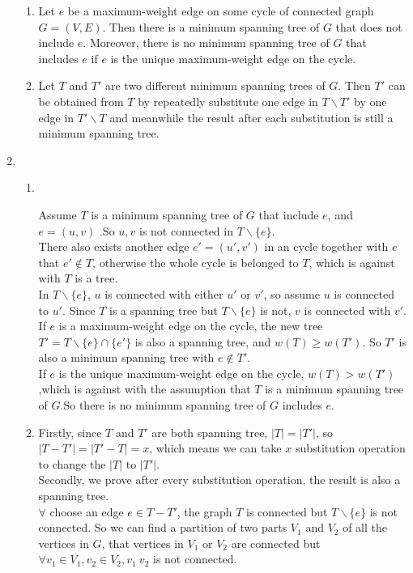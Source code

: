 \documentclass[12pt,a4paper]{article}
\makeatletter
\newtheorem*{solution}{Solution}
\theoremstyle{definition}
\renewenvironment{solution}[1][Solution] {\par\pushQED{\qed}\normalfont\topsep6\p@\@plus6\p@\relax\trivlist\item[\hskip\labelsep\bfseries#1\@addpunct{.}]\ignorespaces}{\popQED\endtrivlist\@endpefalse} \makeatother
\makeatother
\begin{document}
\begin{enumerate}
	\begin{enumerate}
		\item Let $e$ be a maximum-weight edge on some cycle of connected graph $G=(V,E)$.
        Then there is a minimum spanning tree of $G$ that does not include $e$. Moreover, there is no minimum spanning tree of $G$ that includes $e$ if $e$ is the unique maximum-weight edge on the cycle. 
		\item Let $T$ and $T'$ are two different minimum spanning trees of $G$. Then $T'$ can be obtained from $T$ by repeatedly substitute one edge in $T\backslash T'$ by one edge in $T'\backslash T$ and meanwhile the result after each substitution is still a minimum spanning tree.
	\end{enumerate}
	\begin{solution}
	~\par
	\begin{enumerate}
	    \item 
	    ~\par
	    Assume $T$ is a minimum spanning tree of $G$ that include $e$, and $e=(u,v)$ .So $u,v$ is not connected in $T\backslash\{e\}$. \\There also exists another edge $e'=(u',v')$ in an cycle together with $e$ that $e'\notin T$, otherwise the whole cycle is belonged to $T$, which is against with $T$ is a tree. \\In $T\backslash\{e\}$, $u$ is connected with either $u'$ or $v'$, so assume $u$ is connected to $u'$. Since $T$ is a spanning tree but $T\backslash\{e\}$ is not, $v$ is connected with $v'$.\\
	    If $e$ is a maximum-weight edge on the cycle, the new tree $T'=T\backslash\{e\}\cap\{e'\}$ is also a spanning tree, and $w(T)\ge w(T')$. So $T'$ is also a minimum spanning tree with $e \notin T'$.\\
	    If  $e$ is the unique maximum-weight edge on the cycle, $w(T)>w(T')$,which is against with the assumption that $T$ is a minimum spanning tree of $G$.So there is no minimum spanning tree of $G$ includes $e$.
	    \item
	    Firstly, since $T$ and $T'$ are both spanning tree, $|T|=|T'|$, so $|T-T'|=|T'-T|=x$, which means we can take $x$ substitution operation to change the $|T|$ to $|T'|$.\\
	    Secondly, we prove after every substitution operation, the result is also a spanning tree.\\
	    $\forall$ choose an edge $e\in T-T'$, the graph $T$ is connected but $T\backslash\{e\}$ is not connected. So we can find a partition of two parts $V_1$ and $V_2$ of all the vertices in $G$, that vertices in $V_1$ or $V_2$ are connected but $\forall v_1\in V_1,v_2\in V_2,v_1~v_2$ is not connected.\\

\end{enumerate}
\end{solution}
\end{enumerate}
\end{document}
